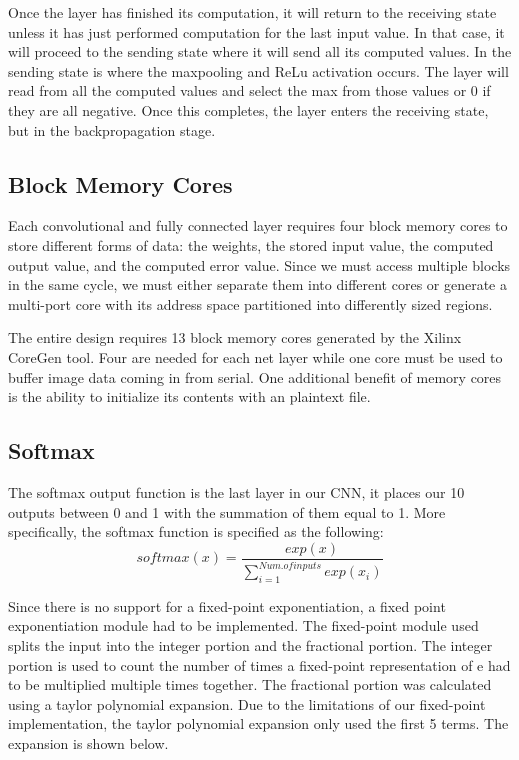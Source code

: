 \documentclass[11pt]{article}
\begin{document}
Once the layer has finished its computation, it will return to the receiving state unless it has just performed computation for the last input value. In that case, it will proceed to the sending state where it will send all its computed values. In the sending state is where the maxpooling and ReLu activation occurs. The layer will read from all the computed values and select the max from those values or 0 if they are all negative. Once this completes, the layer enters the receiving state, but in the backpropagation stage. 

\subsection{Block Memory Cores}

Each convolutional and fully connected layer requires four block memory cores to store different forms of data: the weights, the stored input value, the computed output value, and the computed error value. Since we must access multiple blocks in the same cycle, we must either separate them into different cores or generate a multi-port core with its address space partitioned into differently sized regions. 

The entire design requires 13 block memory cores generated by the Xilinx CoreGen tool. Four are needed for each net layer while one core must be used to buffer image data coming in from serial. One additional benefit of memory cores is the ability to initialize its contents with an plaintext file. 

\subsection{Softmax}
The softmax output function is the last layer in our CNN, it places our 10 outputs between 0 and 1 with the summation of them equal to 1. More specifically, the softmax function is specified as the following: 
$$softmax(x) = \frac{exp(x)}{\sum_{i = 1}^{Num. of inputs} exp(x_i)}$$


Since there is no support for a fixed-point exponentiation, a fixed point exponentiation module had to be implemented. The fixed-point module used splits the input into the integer portion and the fractional portion. The integer portion is used to count the number of times a fixed-point representation of e had to be multiplied multiple times together. The fractional portion was calculated using a taylor polynomial expansion. Due to the limitations of our fixed-point implementation, the taylor polynomial expansion only used the first 5 terms. The expansion is shown below. 
\end{document}
